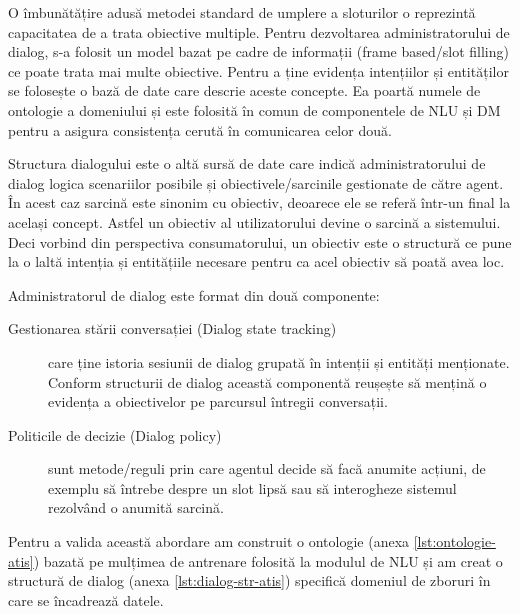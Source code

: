 O îmbunătățire adusă metodei standard de umplere a sloturilor o reprezintă capacitatea de a trata obiective multiple.
Pentru dezvoltarea administratorului de dialog, s-a folosit un model bazat pe cadre de informații (frame based/slot filling) ce poate trata mai multe obiective.
Pentru a ține evidența intențiilor și entităților se folosește o bază de date care descrie aceste concepte. Ea poartă numele de ontologie a domeniului și este folosită în comun de componentele de NLU și DM pentru a asigura consistența cerută în comunicarea celor două.

Structura dialogului este o altă sursă de date care indică administratorului de dialog logica scenariilor posibile și obiectivele/sarcinile gestionate de către agent. În acest caz sarcină este sinonim cu obiectiv, deoarece ele se referă într-un final la același concept. Astfel un obiectiv al utilizatorului devine o sarcină a sistemului. Deci vorbind din perspectiva consumatorului, un obiectiv este o structură ce pune la o laltă intenția și entitățiile necesare pentru ca acel obiectiv să poată avea loc.

Administratorul de dialog este format din două componente: 
\begin{description}
	\item[Gestionarea stării conversației (Dialog state tracking)] care ține istoria sesiunii de dialog grupată în intenții și entități menționate. Conform structurii de dialog această componentă reușește să mențină o evidența a obiectivelor pe parcursul întregii conversații.
	\item[Politicile de decizie (Dialog policy)] sunt metode/reguli prin care agentul decide să facă anumite acțiuni, de exemplu să întrebe despre un slot lipsă sau să interogheze sistemul rezolvând o anumită sarcină.
\end{description}

Pentru a valida această abordare am construit o ontologie (anexa \ref{lst:ontologie-atis}) bazată pe mulțimea de antrenare folosită la modulul de NLU și am creat o structură de dialog (anexa \ref{lst:dialog-str-atis}) specifică domeniul de zboruri în care se încadrează datele.

